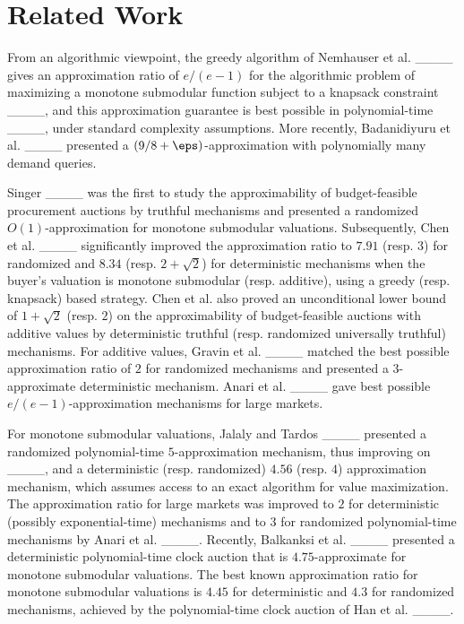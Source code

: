 \section{Related Work}
\label{sec:related}

From an algorithmic viewpoint, the greedy algorithm of Nemhauser et al. ____ gives an approximation ratio of $e/(e-1)$ for the algorithmic problem of maximizing a monotone submodular function subject to a knapsack constraint ____, and this approximation guarantee is best possible in polynomial-time  ____, under standard complexity assumptions. More recently, Badanidiyuru et al. ____ presented a $(9/8+\eps)$-approximation with  polynomially many demand queries.

Singer ____ was the first to study the approximability of budget-feasible procurement auctions by truthful mechanisms and presented a randomized $O(1)$-approximation for monotone submodular valuations. Subsequently, Chen et al. ____ significantly improved the approximation ratio to $7.91$ (resp. $3$) for randomized and $8.34$ (resp. $2+\sqrt{2}$) for deterministic mechanisms when the buyer's valuation is monotone submodular (resp. additive), using a greedy (resp. knapsack) based strategy. Chen et al. also proved an unconditional lower bound of $1+\sqrt{2}$ (resp. $2$) on the approximability of budget-feasible auctions with additive values by deterministic truthful (resp. randomized universally truthful) mechanisms. For additive values, Gravin et al. ____ matched the best possible approximation ratio of $2$ for randomized mechanisms and presented a $3$-approximate deterministic mechanism. Anari et al. ____ gave best possible $e/(e-1)$-approximation mechanisms for large markets. 

For monotone submodular valuations, Jalaly and Tardos ____ presented a randomized polynomial-time $5$-approximation mechanism, thus improving on ____, 
and a deterministic (resp. randomized) $4.56$ (resp. $4$) approximation mechanism, which assumes access to an exact algorithm for value maximization.
The approximation ratio for large markets was improved to $2$ for deterministic (possibly exponential-time) mechanisms and to $3$ for randomized polynomial-time mechanisms by Anari et al. ____. Recently, Balkanksi et al. ____ presented a deterministic polynomial-time clock auction that is $4.75$-approximate for monotone submodular valuations. The best known approximation ratio for monotone submodular valuations is $4.45$ for deterministic and $4.3$ for randomized mechanisms, achieved by the polynomial-time clock auction of Han et al. ____. %

